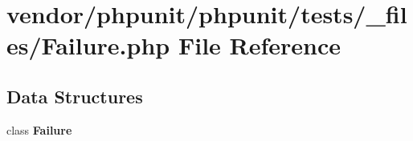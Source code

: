 \section{vendor/phpunit/phpunit/tests/\+\_\+files/\+Failure.php File Reference}
\label{_failure_8php}
\subsection*{Data Structures}
\begin{DoxyCompactItemize}
\item 
class {\bf Failure}
\end{DoxyCompactItemize}
